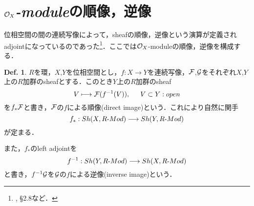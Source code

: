 \documentclass[dvipdfmx,b5paper,papersize]{jsarticle}
\theoremstyle{definition}
\newtheorem{defi}[thm]{Def.}
\begin{document}
\section{${\cal{O}}_X${\it-module}の順像，逆像}
位相空間の間の連続写像によって，sheafの順像，逆像という演算が定義されadjointになっているのであった\footnote{\cite{Gortz}, \S 2.8など．}．ここでは${\cal{O}}_X$-moduleの順像，逆像を構成する．
\begin{defi}
  $R$を環，$X$,$Y$を位相空間とし，$f:X \longrightarrow Y$を連続写像，$\cal{F}$,$\cal{G}$をそれぞれ$X$,$Y$上の$R$加群のsheafとする．このとき$Y$上の$R$加群のsheaf
  \[
    V \longmapsto {\cal{F}}(f^{-1}(V)), \hspace{15pt} V \subset Y:open
  \]
  を$f_*{\cal{F}}$と書き，$\cal{F}$の$f$による順像(direct image)という．これにより自然に関手
  \[
    f_*:Sh(X,R\mathchar`-Mod) \longrightarrow Sh(Y,R\mathchar`-Mod)
  \]
  が定まる．

  また，$f_*$のleft adjointを
  \[
    f^{-1}:Sh(Y,R\mathchar`-Mod) \longrightarrow Sh(X,R\mathchar`-Mod)
  \]
  と書き，$f^{-1}\cal{G}$を$\cal{G}$の$f$による逆像(inverse image)という．
\end{defi}
\end{document}
